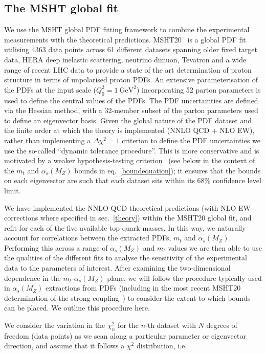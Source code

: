 \documentclass[sn-mathphys]{sn-jnl}%
\newcommand{\mt}{m_t}
\newcommand{\as}{\alpha_s(M_Z)}
\begin{document}
\subsection{The MSHT global fit} \label{methodology}
We use the MSHT global PDF fitting framework to combine the experimental measurements with the theoretical predictions. MSHT20~\cite{Bailey:2020ooq} is a global PDF fit utilising 4363 data points across 61 different datasets spanning older fixed target data, HERA deep inelastic scattering, neutrino dimuon, Tevatron and a wide range of recent LHC data to provide a state of the art determination of proton structure in terms of unpolarised proton PDFs. An extensive parameterisation of the PDFs at the input scale ($Q_0^2=1~\mathrm{GeV}^2$) incorporating 52 parton parameters is used to define the central values of the PDFs. The PDF uncertainties are defined via the Hessian method, with a 32-member subset of the parton parameters used to define an eigenvector basis. Given the global nature of the PDF dataset and the finite order at which the theory is implemented (NNLO QCD + NLO EW), rather than implementing a $\Delta\chi^2=1$ criterion to define the PDF uncertainties we use the so-called ``dynamic tolerance procedure''. This is more conservative and is motivated by a weaker hypothesis-testing criterion~\cite{Martin:2009iq} (see below in the context of the $\mt$ and $\as$ bounds in eq.~\ref{boundequation}); it ensures that the bounds on each eigenvector are such that each dataset sits within its 68\% confidence level limit.

We have implemented the NNLO QCD theoretical predictions (with NLO EW corrections where specified in sec.~\ref{theory}) within the MSHT20 global fit, and refit for each of the five available top-quark masses. In this way, we naturally account for correlations between the extracted PDFs, $\mt$ and $\as$. Performing this across a range of $\as$ and $\mt$ values we are then able to use the qualities of the different fits to analyse the sensitivity of the experimental data to the parameters of interest. After examining the two-dimensional dependence in the $\mt$-$\as$ plane, we will follow the procedure typically used in $\as$ extractions from PDFs (including in the most recent MSHT20 determination of the strong coupling~\cite{Cridge:2021qfd}) to consider the extent to which bounds can be placed.  We outline this procedure here. 

We consider the variation in the $\chi^2_n$ for the $n$-th dataset with $N$ degrees of freedom (data points) as we scan along a particular parameter or eigenvector direction, and assume that it follows a $\chi^2$ distribution, i.e. 
\end{document}
